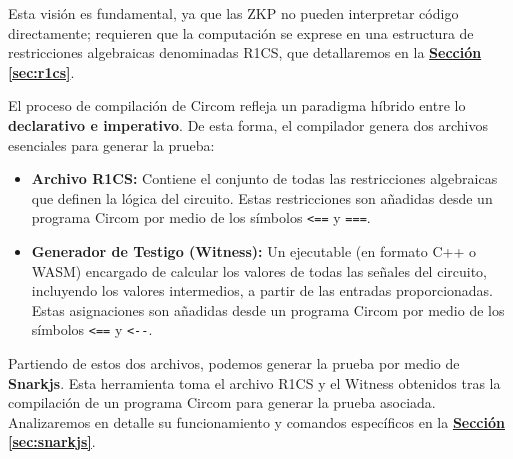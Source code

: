 \documentclass[a4paper,12pt]{report}
\begin{document}
	\vspace{0.3cm}
	
	\noindent Esta visión es fundamental, ya que las ZKP no pueden interpretar código directamente; requieren que la computación se exprese en una estructura de restricciones algebraicas denominadas R1CS, que detallaremos en la \hyperref[sec:r1cs]{\textbf{Sección \ref{sec:r1cs}}}.
	
	
	\vspace{0.3cm}
	
	\noindent El proceso de compilación de Circom refleja un paradigma híbrido entre lo \textbf{declarativo e imperativo}. De esta forma, el compilador genera dos archivos esenciales para generar la prueba:
	
	\begin{itemize}
		\item \textbf{Archivo R1CS:} Contiene el conjunto de todas las restricciones algebraicas que definen la lógica del circuito. Estas restricciones son añadidas desde un programa Circom por medio de los símbolos \texttt{<==} y \texttt{===}.
		\item \textbf{Generador de Testigo (Witness):} Un ejecutable (en formato C++ o WASM) encargado de calcular los valores de todas las señales del circuito, incluyendo los valores intermedios, a partir de las entradas proporcionadas. Estas asignaciones son añadidas desde un programa Circom por medio de los símbolos \texttt{<==} y \texttt{<-}\texttt{-}.
	\end{itemize}
	
	\vspace{0.3cm}
	
	\noindent Partiendo de estos dos archivos, podemos generar la prueba por medio de \textbf{Snarkjs}. Esta herramienta toma el archivo R1CS y el Witness obtenidos tras la compilación de un programa Circom para generar la prueba asociada. Analizaremos en detalle su funcionamiento y comandos específicos en la \hyperref[sec:snarkjs]{\textbf{Sección \ref{sec:snarkjs}}}.
	
	
\end{document}
